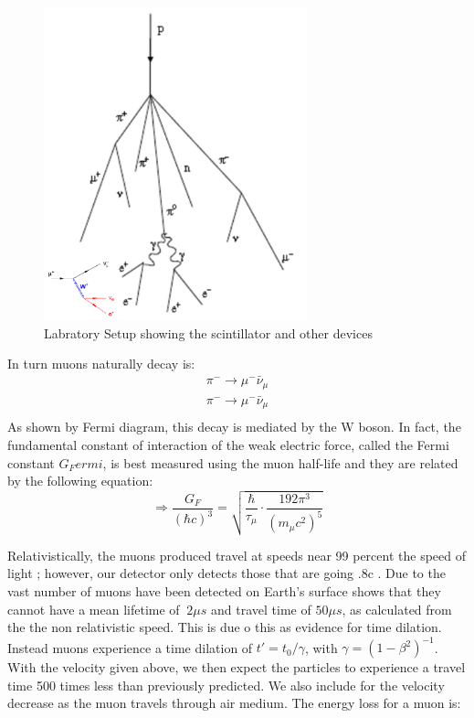 \documentclass[12pt,twocolumn]{article}
\begin{document}
\begin{figure}[h!]
	\centering
	\label{fig:Cosmic}
	\includegraphics[width=3in]{images/Cosmic}
	\caption{Labratory Setup showing the scintillator and other devices}
\end{figure}
In turn muons naturally decay is:
\begin{equation}
	\label{eq:PionDecay}
	\begin{array}{c}
	\pi^{-} \rightarrow\mu^{-}\bar{\nu}_{\mu} \\
    \pi^{-} \rightarrow\mu^{-}\bar{\nu}_{\mu} \\
\end{array}
\end{equation}
As shown by Fermi diagram, this decay is mediated by the W boson. In fact, the fundamental constant of interaction of the weak electric force, called the Fermi constant $G_Fermi$, is best measured using the muon half-life and they are related by the following equation:
\begin{equation}
	\label{eq:Gf}
	\Rightarrow \frac{G_F}{(\hbar c)^3}=\sqrt{\frac{\hbar}{\tau_\mu}\cdot\frac{19 2\pi^3}{(m_\mu c^2)^5}}
\end{equation}

Relativistically, the muons produced travel at speeds near 99 percent the speed of light \cite{PDG}; however, our detector only detects those that are going .8c \cite{MUON}.  Due to the vast number of muons have been detected on Earth's surface shows that they cannot have a mean lifetime of $~2\mu s$ and travel time of $50\mu s$, as calculated from the the non relativistic speed. This is due o this as evidence for time dilation. Instead muons experience a time dilation of $t'=t_{0}/\gamma$, with $\gamma=\left(1-\beta^{2}\right)^{-1}$. With the velocity given above, we then expect the particles to experience a travel time 500 times less than previously predicted. We also include for the velocity decrease as the muon travels through air medium. The energy loss for a muon \cite{MUON} is:
\end{document}
